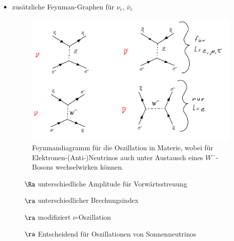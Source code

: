\begin{itemize}
\item {}

zusätzliche Feynman-Graphen für $\nu_e$, $\bar{\nu}_e$
\begin{figure}[!ht]
\centering
\includegraphics[width=.8\textwidth]{imgs/ep5-fig-9-4.pdf}
\caption{Feynmandiagramm für die Oszillation in Materie, wobei für Elektronen-(Anti-)Neutrinos auch unter Austausch eines $W^-$-Bosons wechselwirken können.}
\end{figure}
\begin{itemize}
\item[$\Ra$] unterschiedliche Amplitude für Vorwärtsstreuung
\item[$\ra$] unterschiedlicher Brechungsindex
\item[$\ra$] modifiziert $\nu$-Oszillation
\item[$\ra$] Entscheidend für Oszillationen von Sonnenneutrinos
\end{itemize}
\end{itemize}
